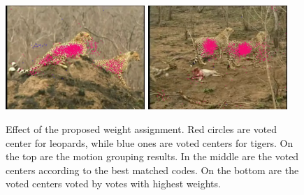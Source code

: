 \begin{figure}
\includegraphics[width=0.47\textwidth,bb=0 0 640 480]{selectVimg00296_19.jpg}
\includegraphics[width=0.47\textwidth,bb=0 0 640 480]{selectVimg01836_19.jpg}

\caption[Effect of the proposed weight assignment]{Effect of the proposed weight assignment. Red circles are voted center for leopards, while blue ones are voted centers for tigers. On the top are the motion grouping results. In the middle are the voted centers according to the best matched codes. On the bottom are the voted centers voted by votes with highest weights.}
\label{fig:bcMP}
\end{figure}

